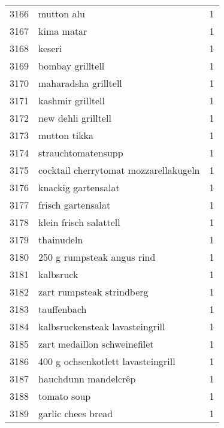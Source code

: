 \begin{tabular}{llr}
3166 &                                         mutton alu &      1 \\
3167 &                                         kima matar &      1 \\
3168 &                                             keseri &      1 \\
3169 &                                   bombay grilltell &      1 \\
3170 &                               maharadsha grilltell &      1 \\
3171 &                                  kashmir grilltell &      1 \\
3172 &                                new dehli grilltell &      1 \\
3173 &                                       mutton tikka &      1 \\
3174 &                                 strauchtomatensupp &      1 \\
3175 &              cocktail cherrytomat mozzarellakugeln &      1 \\
3176 &                                knackig gartensalat &      1 \\
3177 &                                 frisch gartensalat &      1 \\
3178 &                             klein frisch salattell &      1 \\
3179 &                                         thainudeln &      1 \\
3180 &                         250 g rumpsteak angus rind &      1 \\
3181 &                                          kalbsruck &      1 \\
3182 &                          zart rumpsteak strindberg &      1 \\
3183 &                                        tauffenbach &      1 \\
3184 &                    kalbsruckensteak lavasteingrill &      1 \\
3185 &                       zart medaillon schweinefilet &      1 \\
3186 &                 400 g ochsenkotlett lavasteingrill &      1 \\
3187 &                               hauchdunn mandelcrêp &      1 \\
3188 &                                        tomato soup &      1 \\
3189 &                                 garlic chees bread &      1 \\

\end{tabular}
